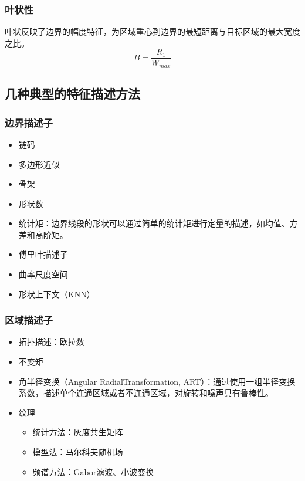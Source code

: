 \subsubsection{叶状性}
叶状反映了边界的幅度特征，为区域重心到边界的最短距离与目标区域的最大宽度之比。
    \begin{displaymath}
    B=\frac{R_{1}}{W_{max}}
    \end{displaymath}
    
\subsection{几种典型的特征描述方法}

\subsubsection{边界描述子}
\begin{itemize}
\item 链码
\item 多边形近似
\item 骨架
\item 形状数
\item 统计矩：边界线段的形状可以通过简单的统计矩进行定量的描述，如均值、方差和高阶矩。
\item 傅里叶描述子
\item 曲率尺度空间
\item 形状上下文（KNN）
\end{itemize}

\subsubsection{区域描述子}
\begin{itemize}
\item 拓扑描述：欧拉数
\item 不变矩
\item 角半径变换（Angular RadialTransformation, ART）：通过使用一组半径变换系数，描述单个连通区域或者不连通区域，对旋转和噪声具有鲁棒性。
\item 纹理
    \begin{itemize}
    \item 统计方法：灰度共生矩阵
    \item 模型法：马尔科夫随机场
    \item 频谱方法：Gabor滤波、小波变换
    \end{itemize}
\end{itemize}

